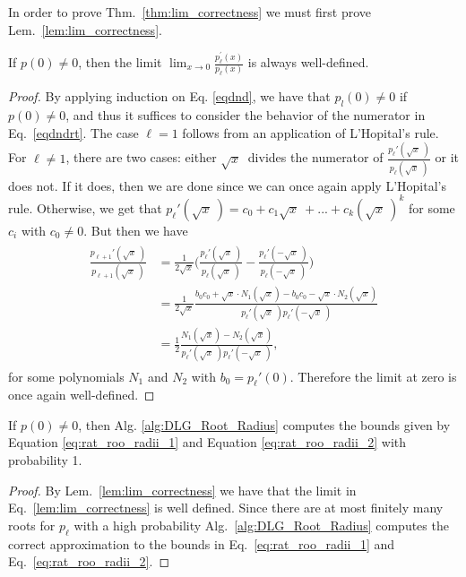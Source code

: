 \documentclass[runningheads]{llncs}
\begin{document}
In order to prove Thm.~\ref{thm:lim_correctness} we must first prove Lem.~\ref{lem:lim_correctness}.
\begin{lemma}\label{lem:lim_correctness}
   If $p(0) \neq 0$, then the limit $ \lim_{x \to 0}\frac{p_\ell^{\prime}(x)}{p_\ell(x)}$ is always well-defined.
   \end{lemma}
\begin{proof}
By applying induction on Eq. \ref{eqdnd}, we have that $p_l(0) \neq 0$ if $p(0) \neq 0$, and thus it suffices to consider the behavior of the numerator in  Eq.~\ref{eqdndrt}. The case $\ell = 1$ follows from an application of L'Hopital's rule. For $\ell \neq 1$, there are two cases: either $\sqrt x~$ divides the numerator of $\frac{p_{\ell}'(\sqrt x~)}{p_{\ell}(\sqrt x~)}$ or it does not. If it does, then we are done since we can once again apply L'Hopital's rule. Otherwise, we get that $p_{\ell}'(\sqrt x~) = c_0+c_1\sqrt x~ + ... +c_k(\sqrt x~)^k$ for some $c_i$ with $c_0 \neq 0$. But then we have
\begin{align*}
\begin{split}
\frac{p_{\ell+1}'(\sqrt x~)}{p_{\ell+1}(\sqrt x~)}
&= \frac{1}{2\sqrt x}\Big(\frac{p_{\ell}'(\sqrt x~)}{p_{\ell}(\sqrt x~)}-\frac{p_{\ell}'(-\sqrt x~)}{p_{\ell}(-\sqrt x~)}\Big) \\
& = \frac{1}{2\sqrt x}\frac{b_0c_0 + \sqrt x \cdot N_1(\sqrt x) - b_0c_0 - \sqrt x \cdot N_2(\sqrt x)}{p_{\ell}'(\sqrt x~)p_{\ell}'(-\sqrt x~)}\\
& = \frac{1}{2}\frac{  N_1(\sqrt x) -  N_2(\sqrt x)}{p_{\ell}'(\sqrt x~)p_{\ell}'(-\sqrt x~)},
\end{split}
\end{align*}
 for some polynomials $N_1$ and $N_2$ with $b_0 = p_{\ell}'(0)$. Therefore the limit at zero is once again well-defined.
\end{proof}
\begin{theorem}\label{thm:lim_correctness}
 If $p(0) \neq 0$, then Alg. \ref{alg:DLG_Root_Radius} computes the bounds given by Equation \ref{eq:rat_roo_radii_1} and Equation \ref{eq:rat_roo_radii_2} with probability 1.
\end{theorem}
\begin{proof}
By Lem.~\ref{lem:lim_correctness} we have that the limit in Eq.~\ref{lem:lim_correctness} is well defined. Since there are at most finitely many roots for $p_\ell$ with a high probability Alg.~\ref{alg:DLG_Root_Radius} computes the correct approximation to the bounds in Eq.~\ref{eq:rat_roo_radii_1} and Eq.~\ref{eq:rat_roo_radii_2}.
\end{proof}
\end{document}
